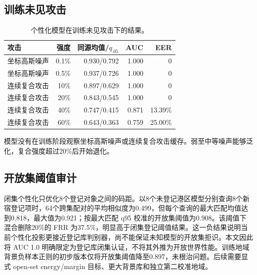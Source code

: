 \documentclass[UTF8,fontset=fandol,12pt]{ctexart}
\begin{document}
\subsection{训练未见攻击}
\begin{table}[H]\centering
\caption{个性化模型在训练未见攻击下的结果。}\label{tab:unseen}
\begin{tabular}{lrrrr}
\toprule 攻击 & 强度 & 同源均值/$q_{.05}$ & AUC & EER\\
\midrule 坐标高斯噪声 & 0.1\% & 0.930/0.792 & 1.000 & 0\\
坐标高斯噪声 & 0.5\% & 0.937/0.726 & 1.000 & 0\\
连续复合攻击 & 10\% & 0.897/0.629 & 1.000 & 0\\
连续复合攻击 & 20\% & 0.843/0.545 & 1.000 & 0\\
连续复合攻击 & 40\% & 0.747/0.415 & 0.871 & 13.39\%\\
连续复合攻击 & 60\% & 0.643/0.363 & 0.759 & 25.00\%\\
\bottomrule
\end{tabular}
\end{table}
模型没有在训练阶段观察坐标高斯噪声或连续复合攻击缓存。弱至中等噪声能够泛化，复合强度超过20\%后开始退化。

\subsection{开放集阈值审计}
闭集个性化只优化8个登记对象之间的码距。以8个未登记港区模型分别查询8个新宿登记项时，64个跨集配对的平均相似度为0.499，但每个查询的最大匹配均值达到0.818，最大值为0.921；按最大匹配 q95 校准的开放集阈值为0.908。该阈值下混合删除20\%的 FRR 为37.5\%，明显高于闭集登记阈值结果。这一负结果说明当前个性化投影更接近登记库判别器，尚不能保证未知模型的开放集拒识。本文因此将 AUC 1.0 明确限定为登记库闭集认证，不将其外推为开放世界性能。训练地域背景负样本正则的初步版本仅将开放集阈值降至0.897，未根治问题。后续需要显式 open-set energy/margin 目标、更大背景库和独立第二校准地域。
\end{document}

